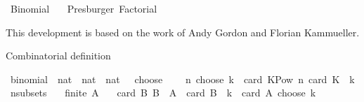 %
\begin{isabellebody}%
%
%
\isadelimdocument
%
\endisadelimdocument
%
\isatagdocument
%
\isamarkuptrue%
%
\endisatagdocument
{\isafolddocument}%
%
\isadelimdocument
%
\endisadelimdocument
%
\isadelimtheory
%
\endisadelimtheory
%
\isatagtheory
{}\isamarkupfalse%
\ Binomial\isanewline
\ \ \ Presburger\ Factorial\isanewline
{}%
\endisatagtheory
{\isafoldtheory}%
%
\isadelimtheory
%
\endisadelimtheory
%
\isadelimdocument
%
\endisadelimdocument
%
\isatagdocument
%
\isamarkuptrue%
%
\endisatagdocument
{\isafolddocument}%
%
\isadelimdocument
%
\endisadelimdocument
%
\begin{isamarkuptext}%
This development is based on the work of Andy Gordon and Florian Kammueller.%
\end{isamarkuptext}\isamarkuptrue%
%
\begin{isamarkuptext}%
Combinatorial definition%
\end{isamarkuptext}\isamarkuptrue%
\isamarkupfalse%
\ binomial\ {\isacharcolon}{\kern0pt}{\isacharcolon}{\kern0pt}\ {\isachardoublequoteopen}nat\ {\isasymRightarrow}\ nat\ {\isasymRightarrow}\ nat{\isachardoublequoteclose}\ \ {\isacharparenleft}{\kern0pt}\ {\isachardoublequoteopen}choose{\isachardoublequoteclose}\ {}{}{\isacharparenright}{\kern0pt}\isanewline
\ \ \ {\isachardoublequoteopen}n\ choose\ k\ {\isacharequal}{\kern0pt}\ card\ {\isacharbraceleft}{\kern0pt}K{\isasymin}Pow\ {\isacharbraceleft}{\kern0pt}{}{\isachardot}{\kern0pt}{\isachardot}{\kern0pt}{\isacharless}{\kern0pt}n{\isacharbraceright}{\kern0pt}{\isachardot}{\kern0pt}\ card\ K\ {\isacharequal}{\kern0pt}\ k{\isacharbraceright}{\kern0pt}{\isachardoublequoteclose}\isanewline
\isanewline
{}\isamarkupfalse%
\ n{\isacharunderscore}{\kern0pt}subsets{\isacharcolon}{\kern0pt}\isanewline
\ \ \ {\isachardoublequoteopen}finite\ A{\isachardoublequoteclose}\isanewline
\ \ \ {\isachardoublequoteopen}card\ {\isacharbraceleft}{\kern0pt}B{\isachardot}{\kern0pt}\ B\ {\isasymsubseteq}\ A\ {\isasymand}\ card\ B\ {\isacharequal}{\kern0pt}\ k{\isacharbraceright}{\kern0pt}\ {\isacharequal}{\kern0pt}\ card\ A\ choose\ k{\isachardoublequoteclose}\isanewline
%
\isadelimproof
%
\endisadelimproof
%
\isatagproof
{}\isamarkupfalse%

\end{isabellebody}
